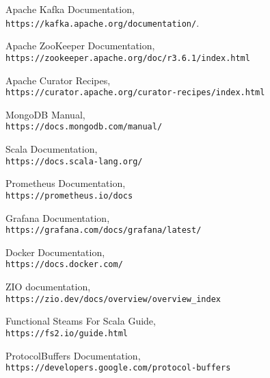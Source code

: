 \documentclass[14pt]{article}
\begin{document}
\begin{thebibliography}{9}
Apache Kafka Documentation,\\
\texttt{https://kafka.apache.org/documentation/}.

Apache ZooKeeper Documentation,\\
\texttt{https://zookeeper.apache.org/doc/r3.6.1/index.html}

Apache Curator Recipes,\\
\texttt{https://curator.apache.org/curator-recipes/index.html}

MongoDB Manual,\\
\texttt{https://docs.mongodb.com/manual/}

Scala Documentation,\\
\texttt{https://docs.scala-lang.org/}

Prometheus Documentation,\\
\texttt{https://prometheus.io/docs}

Grafana Documentation,\\
\texttt{https://grafana.com/docs/grafana/latest/}

Docker Documentation,\\
\texttt{https://docs.docker.com/}

ZIO documentation,\\
\texttt{https://zio.dev/docs/overview/overview\_index}

Functional Steams For Scala Guide,\\
\texttt{https://fs2.io/guide.html}

ProtocolBuffers Documentation,\\
\texttt{https://developers.google.com/protocol-buffers}
\end{thebibliography}
\end{document}
